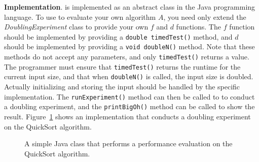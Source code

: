 
    {\bf Implementation}.
    \toolname is implemented as an abstract class in the Java
    programming language.  To use \toolname to evaluate your own
    algorithm $A$, you need only extend the \textit{DoublingExperiment}
    class to provide your own $f$ and $d$ functions.  The $f$ function should be
    implemented by providing a \texttt{double timedTest()} method,
    and $d$ should be implemented by providing a \texttt{void doubleN()}
    method. Note that these methods do not accept any parameters,
    and only \texttt{timedTest()} returns a value. The programmer
    must ensure that \texttt{timedTest()} returns the runtime for the
    current input size, and that when \texttt{doubleN()} is called,
    the input size is doubled.  Actually initializing and storing the
    input should be handled by the specific implementation. The
    \texttt{runExperiment()} method can then be called to to conduct
    a doubling experiment, and the \texttt{printBigOh()} method can
    be called to show the result. Figure~\ref{fig:qsprogram} shows an
    implementation that conducts a doubling experiment on the QuickSort
    algorithm.


    
    \begin{figure}[t]
    
    \vspace{-0.15in}
    \caption{A simple Java class that performs a performance evaluation
    on the QuickSort algorithm.}\vspace{-0.20in}
    \label{fig:qsprogram}
    \end{figure}
